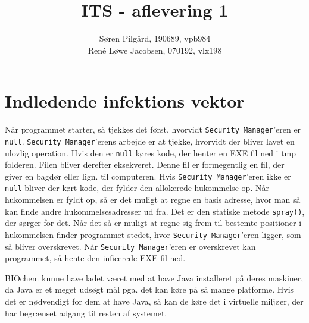 \documentclass[10pt,a4paper,danish]{article}
\title{ITS - aflevering 1}
\author{Søren Pilgård, 190689, vpb984\\
René Løwe Jacobsen, 070192, vlx198}
\begin{document}
\maketitle
\newpage

\tableofcontents
\newpage

\section{Indledende infektions vektor}
Når programmet starter, så tjekkes det først, hvorvidt \texttt{Security Manager}'eren
er \texttt{null}. \texttt{Security Manager}'erens arbejde er at tjekke, hvorvidt
der bliver lavet en ulovlig operation.
Hvis den er \texttt{null} køres kode, der henter en EXE fil ned
i tmp folderen. Filen bliver derefter eksekveret.
Denne fil er formegentlig en fil, der giver en bagdør eller lign. til computeren.
Hvis \texttt{Security Manager}'eren ikke er \texttt{null} bliver der kørt kode,
der fylder den allokerede hukommelse op. Når hukommelsen er fyldt op, så er det
muligt at regne en basis adresse, hvor man så kan finde andre hukommelsesadresser
ud fra.
Det er den statiske metode \texttt{spray()}, der sørger for det.
Når det så er muligt at regne sig frem til bestemte positioner i hukommelsen
finder programmet stedet, hvor \texttt{Security Manager}'eren ligger, som
så bliver overskrevet.
Når \texttt{Security Manager}'eren er overskrevet kan programmet, så hente den
inficerede EXE fil ned.

BIOchem kunne have ladet været med at have Java installeret på deres maskiner,
da Java er et meget udsøgt mål pga. det kan køre på så mange platforme.
Hvis det er nødvendigt for dem at have Java, så kan de køre det i virtuelle miljøer,
der har begrænset adgang til resten af systemet.




\end{document}
